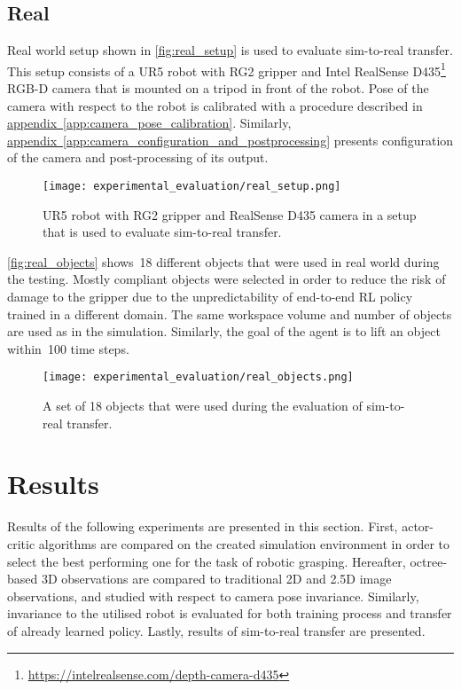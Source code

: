 \subsection{Real}\label{subsec:real_setup}

Real world setup shown in \autoref{fig:real_setup} is used to evaluate sim-to-real transfer. This setup consists of a UR5 robot with RG2 gripper and Intel RealSense D435\footnote{\href{https://intelrealsense.com/depth-camera-d435}{https://intelrealsense.com/depth-camera-d435}} RGB-D camera that is mounted on a tripod in front of the robot. Pose of the camera with respect to the robot is calibrated with a procedure described in \hyperref[app:camera_pose_calibration]{appendix~\ref*{app:camera_pose_calibration}}. Similarly, \hyperref[app:camera_configuration_and_postprocessing]{appendix~\ref*{app:camera_configuration_and_postprocessing}} presents configuration of the camera and post-processing of its output.

\begin{figure}[ht]
    \centering
    \texttt{[image: experimental\_evaluation/real\_setup.png]}
    \caption{UR5 robot with RG2 gripper and RealSense D435 camera in a setup that is used to evaluate sim-to-real transfer.}
    \label{fig:real_setup}
\end{figure}

\autoref{fig:real_objects} shows~18 different objects that were used in real world during the testing. Mostly compliant objects were selected in order to reduce the risk of damage to the gripper due to the unpredictability of end-to-end RL policy trained in a different domain. The same workspace volume and number of objects are used as in the simulation. Similarly, the goal of the agent is to lift an object within~100 time steps.

\begin{figure}[ht]
    \centering
    \texttt{[image: experimental\_evaluation/real\_objects.png]}
    \caption{A set of 18 objects that were used during the evaluation of sim-to-real transfer.}
    \label{fig:real_objects}
\end{figure}


\section{Results}

Results of the following experiments are presented in this section. First, actor-critic algorithms are compared on the created simulation environment in order to select the best performing one for the task of robotic grasping. Hereafter, octree-based 3D observations are compared to traditional 2D and 2.5D image observations, and studied with respect to camera pose invariance. Similarly, invariance to the utilised robot is evaluated for both training process and transfer of already learned policy. Lastly, results of sim-to-real transfer are presented.

